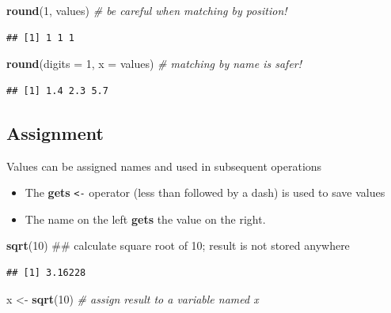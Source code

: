 \documentclass[]{book}
\newenvironment{Shaded}{\begin{snugshade}}{\end{snugshade}}
\newcommand{\KeywordTok}[1]{\textcolor[rgb]{0.13,0.29,0.53}{\textbf{#1}}}
\newcommand{\DataTypeTok}[1]{\textcolor[rgb]{0.13,0.29,0.53}{#1}}
\newcommand{\DecValTok}[1]{\textcolor[rgb]{0.00,0.00,0.81}{#1}}
\newcommand{\StringTok}[1]{\textcolor[rgb]{0.31,0.60,0.02}{#1}}
\newcommand{\CommentTok}[1]{\textcolor[rgb]{0.56,0.35,0.01}{\textit{#1}}}
\newcommand{\NormalTok}[1]{#1}
\providecommand{\tightlist}{%
  \setlength{\itemsep}{0pt}\setlength{\parskip}{0pt}}
\begin{document}
\begin{Shaded}
\begin{Highlighting}[]
\KeywordTok{round}\NormalTok{(}\DecValTok{1}\NormalTok{, values) }\CommentTok{# be careful when matching by position!}
\end{Highlighting}
\end{Shaded}

\begin{verbatim}
## [1] 1 1 1
\end{verbatim}

\begin{Shaded}
\begin{Highlighting}[]
\KeywordTok{round}\NormalTok{(}\DataTypeTok{digits =} \DecValTok{1}\NormalTok{, }\DataTypeTok{x =}\NormalTok{ values) }\CommentTok{# matching by name is safer!}
\end{Highlighting}
\end{Shaded}

\begin{verbatim}
## [1] 1.4 2.3 5.7
\end{verbatim}

\subsection{Assignment}\label{assignment}

Values can be assigned names and used in subsequent operations

\begin{itemize}
\tightlist
\item
  The \textbf{gets} \texttt{\textless{}-} operator (less than followed
  by a dash) is used to save values
\item
  The name on the left \textbf{gets} the value on the right.
\end{itemize}

\begin{Shaded}
\begin{Highlighting}[]
\KeywordTok{sqrt}\NormalTok{(}\DecValTok{10}\NormalTok{) ## calculate square root of 10; result is not stored anywhere}
\end{Highlighting}
\end{Shaded}

\begin{verbatim}
## [1] 3.16228
\end{verbatim}

\begin{Shaded}
\begin{Highlighting}[]
\NormalTok{x <-}\StringTok{ }\KeywordTok{sqrt}\NormalTok{(}\DecValTok{10}\NormalTok{) }\CommentTok{# assign result to a variable named x}
\end{Highlighting}
\end{Shaded}
\end{document}

